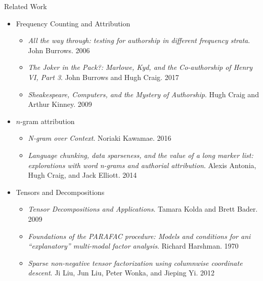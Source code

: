 \documentclass[handout]{beamer}
\begin{document}
\begin{frame}[allowframebreaks]{Related Work}
  \begin{itemize}[<+->]
  \item Frequency Counting and Attribution
    \begin{itemize}
    \item {\em All the way through: testing for authorship in different
      frequency strata}. John Burrows. 2006~\cite{burrows2006}
    \item {\em The Joker in the Pack?: Marlowe, Kyd, and the
        Co-authorship of Henry VI, Part 3}. John Burrows and Hugh
      Craig. 2017~\cite{burrows2017}
    \item {\em Sheakespeare, Computers, and the Mystery of
        Authorship}. Hugh Craig and Arthur Kinney. 2009~\cite{craig2009}
    \end{itemize}
  \item $n$-gram attribution
    \begin{itemize}[<+->]
    \item {\em N-gram over Context}. Noriaki Kawamae. 2016~\cite{kawamae2016}
    \item {\em Language chunking, data sparseness, and the value of a
        long marker list: explorations with word n-grams and authorial
        attribution}. Alexis Antonia, Hugh Craig, and Jack
      Elliott. 2014~\cite{antonia2014}
    \end{itemize}
  \item Tensors and Decompositions
    \begin{itemize}[<+->]
    \item {\em Tensor Decompositions and Applications}. Tamara Kolda
      and Brett Bader. 2009~\cite{kolda2009}
    \item {\em Foundations of the PARAFAC procedure: Models and
        conditions for ani ``explanatory'' multi-modal factor
        analysis}. Richard Harshman. 1970~\cite{harshman1970}
    \item {\em Sparse non-negative tensor factorization using
        columnwise coordinate descent}. Ji Liu, Jun Liu, Peter Wonka,
      and Jieping Yi. 2012\cite{liu2012sparse}
    \end{itemize}
  \end{itemize}
\end{frame}
\end{document}
